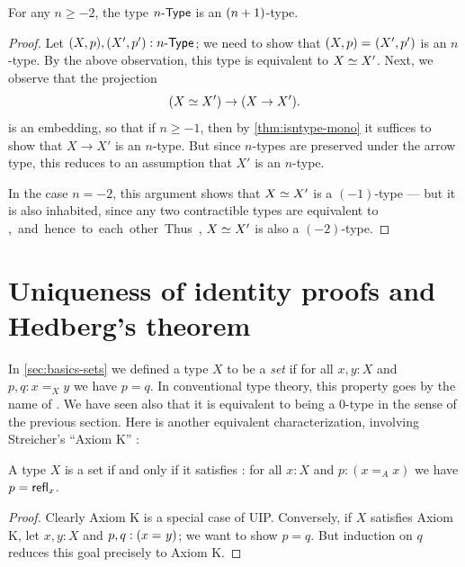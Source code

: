 \begin{thm}\label{thm:hleveln-of-hlevelSn}
 For any $n \geq -2$, the type ${n}\text-\mathsf{Type}$ is an $(n+1)$-type.
\end{thm}
\begin{proof}%
  Let $(X, p), (X', p') : {n}\text-\mathsf{Type}$; we need to show that $(X, p) =_{} (X', p')$ is an $n$-type.
  By the above observation, this type is equivalent to $X \simeq X'$.
  Next, we observe that the projection
  \[(X \simeq X') \to (X \rightarrow X').\]
  is an embedding, so that if $n\geq -1$, then by \cref{thm:isntype-mono} it suffices to show that $X \rightarrow X'$ is an $n$-type.
  But since $n$-types are preserved under the arrow type, this reduces to an assumption that $X'$ is an $n$-type.

  In the case $n=-2$, this argument shows that $X \simeq X'$ is a $(-1)$-type --- but it is also inhabited, since any two contractible types
are equivalent to \unit, and hence to each other.
  Thus, $X \simeq X'$ is also a $(-2)$-type.
\end{proof}

\section{Uniqueness of identity proofs and Hedberg's theorem}
\label{sec:hedberg}

%

In \cref{sec:basics-sets} we defined a type $X$ to be a \emph{set} if for all $x, y : X$ and $p, q : x =_X y$ we have $p = q$.
In conventional type theory, this property goes by the name of .
%
We have seen also that it is equivalent to being a $0$-type in the sense of the previous section.
Here is another equivalent characterization, involving Streicher's ``Axiom K'' \cite{Streicher93}:

\begin{thm}\label{thm:h-set-uip-K}
 A type $X$ is a set if and only if it satisfies :
 for all $x : X$ and $p : (x =_A x)$ we have $p = \mathsf{refl}_{x}$.
\end{thm}

\begin{proof}
  Clearly Axiom K is a special case of UIP.
  Conversely, if $X$ satisfies Axiom K, let $x, y : X$ and $p, q : (x =_{} y)$; we want to show $p=q$.
  But induction on $q$ reduces this goal precisely to Axiom K.
\end{proof}

